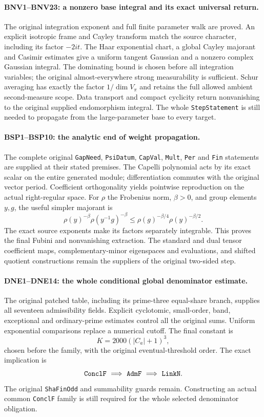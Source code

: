 \paragraph{BNV1--BNV23: a nonzero base integral and its exact universal return.}
The original integration exponent and full finite parameter walk are
proved. An explicit isotropic frame and Cayley transform match the
source character, including its factor $-2it$. The Haar exponential
chart, a global Cayley majorant and Casimir estimates give a uniform
tangent Gaussian and a nonzero complex Gaussian integral. The
dominating bound is chosen before all integration variables; the
original almost-everywhere strong measurability is sufficient. Schur
averaging has exactly the factor $1/\dim V_\pi$ and retains the full
allowed ambient second-measure scope. Data transport and compact
cyclicity return nonvanishing to the original supplied endomorphism
integral. The whole \texttt{Step\allowbreak Statement} is still needed to
propagate from the large-parameter base to every target.

\paragraph{BSP1--BSP10: the analytic end of weight propagation.}
The complete original \texttt{Gap\allowbreak Need}, \texttt{Psi\allowbreak Datum},
\texttt{Cap\allowbreak Val}, \texttt{Mult}, \texttt{Per} and
\texttt{Fin} statements are supplied at their stated premises.
The Capelli polynomial acts by its exact scalar on the entire generated
module; differentiation commutes with the original vector period.
Coefficient orthogonality yields pointwise reproduction on the actual
right-regular space. For $\rho$ the Frobenius norm, $\beta>0$, and
group elements $y,g$, the useful simpler majorant is
\[
 \rho(y)^{-\beta}\rho(y^{-1}g)^{-\beta}
 \le \rho(g)^{-\beta/4}\rho(y)^{-\beta/2}.
\]
The exact source exponents make its factors separately integrable.
This proves the final Fubini and nonvanishing extraction. The standard
and dual tensor coefficient maps, complementary-minor eigenspaces and
evaluations, and shifted quotient constructions remain the suppliers
of the original two-sided step.

\paragraph{DNE1--DNE14: the whole conditional global denominator estimate.}
The original patched table, including its prime-three equal-share
branch, supplies all seventeen admissibility fields. Explicit
cyclotomic, small-order, band, exceptional and ordinary-prime estimates
control all the original sums. Uniform exponential comparisons replace
a numerical cutoff. The final constant is
\[
                    K=2000(|C_a|+1)^3,
\]
chosen before the family, with the original eventual-threshold order.
The exact implication is
\[
 \texttt{Concl\allowbreak F}\ \Longrightarrow\ \texttt{Adm\allowbreak F}
                  \ \Longrightarrow\ \texttt{Link\allowbreak N}.
\]
The original \texttt{Sha\allowbreak Fin\allowbreak Odd} and summability guards remain.
Constructing an actual common \texttt{Concl\allowbreak F} family is still required
for the whole selected denominator obligation.

